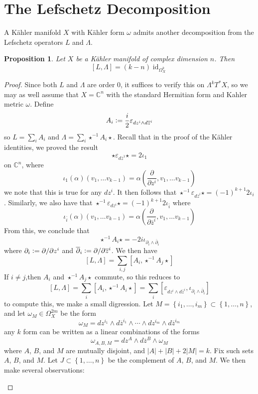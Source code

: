 \documentclass[psamsfonts, 12pt]{amsart}
\newtheorem{prop}[thm]{Proposition}
\theoremstyle{definition}
\theoremstyle{remark}
\newcommand{\C}{\mathbb{C}}
\newcommand{\dbar}{\overline{\partial}}
\newcommand{\zbar}{\overline{z}}
\newcommand{\inv}{^{-1}}
\newcommand{\set}[1]{\left\lbrace #1 \right\rbrace}
\newcommand{\defeq}{\vcentcolon=}
\DeclareMathOperator{\id}{id}
\begin{document}
\section{The Lefschetz Decomposition}
%
A K\"ahler manifold $X$ with K\"ahler form $\omega$ admits another decomposition
from the Lefschetz operators $L$ and $\Lambda$.
%
\begin{prop}
Let $X$ be a K\"ahler manifold of complex dimension $n$. Then
\[
[L,\Lambda] = (k-n)\id_{\Omega^k_X}
\]
\end{prop}
%
\begin{proof}
Since both $L$ and $\Lambda$ are order $0$, it suffices to verify this on
$\Lambda^kT^*X$, so we may as well assume that $X = \C^n$ with the standard Hermitian
form and Kahler metric $\omega$. Define
\[
A_i \defeq \frac{i}{2}\varepsilon_{dz^i\wedge d\zbar^i}
\]
so $L = \sum_i A_i$ and $\Lambda = \sum_i\star\inv A_i\star$. Recall that in the proof
of the K\"ahler identities, we proved the result
\[
\star\varepsilon_{d\zbar^1}\star = 2\iota_1
\]
on $\C^n$, where
\[
\iota_1(\alpha)(v_1,\ldots v_{k-1})
= \alpha\left(\frac{\partial}{\partial z^i}, v_1, \ldots v_{k-1} \right)
\]
we note that this is true for any $dz^i$. It then follows that
$\star\inv\varepsilon_{d\zbar^i}\star = (-1)^{k+1}2\iota_i$. Similarly, we also have
that $\star\inv\varepsilon_{dz^i}\star = (-1)^{k+1}2\iota_{\bar{i}}$ where
\[
\iota_{\bar{i}}(\alpha)(v_1,\ldots v_{k-1})
= \alpha\left(\frac{\partial}{\partial \zbar^i}, v_1, \ldots v_{k-1} \right)
\]
From this, we conclude that
\[
\star\inv A_i\star = -2i\iota_{\partial_i \wedge \dbar_i}
\]
where $\partial_i \defeq \partial/\partial z^i$ and
$\dbar_i \defeq \partial/\partial\zbar^i$. We then have
\[
[L,\Lambda] = \sum_{i,j} [A_i,\star\inv A_j\star]
\]
If $i \neq j$,then $A_i$ and $\star\inv A_j\star$ commute, so this reduces to
\[
[L,\Lambda]= \sum_i [A_i, \star\inv A_i\star] =
\sum_i [\varepsilon_{dz^i\wedge d\zbar^i}, \iota_{\partial_i \wedge \dbar_i}]
\]
to compute this, we make a small digression. Let
$M = \set{i_1,\ldots, i_m} \subset \set{1,\ldots, n}$,
and let $\omega_M \in \Omega^{2m}_X$ be the form
\[
\omega_M = dz^{i_1}\wedge d\zbar^{i_1} \wedge\cdots\wedge dz^{i_m}\wedge d\zbar^{i_m}
\]
any $k$ form can be written as a linear combinations of the forms
\[
\omega_{A,B,M} = dz^A \wedge d\zbar^B \wedge \omega_M
\]
where $A$, $B$, and $M$ are mutually disjoint, and $|A| + |B| + 2|M| = k$. Fix such
sets $A$, $B$, and $M$. Let $J \subset \set{1,\ldots, n}$ be the complement of
$A$, $B$, and $M$. We then make several observations:
\begin{enumerate}

\end{enumerate}
\end{proof}
\end{document}
